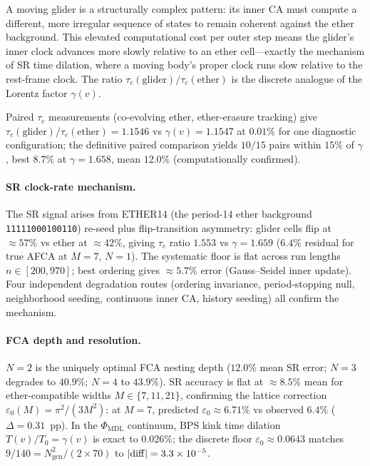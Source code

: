 \documentclass[11pt]{article}
\theoremstyle{remark}
\newcommand{\CatA}{computationally confirmed}
\begin{document}
A moving glider is a structurally complex pattern: its inner CA must compute
a different, more irregular sequence of states to remain coherent against
the ether background.
This elevated computational cost per outer step means the glider's inner
clock advances more slowly relative to an ether cell---exactly the mechanism
of SR time dilation, where a moving body's proper clock runs slow relative to
the rest-frame clock.
The ratio $\tau_c(\mathrm{glider})/\tau_c(\mathrm{ether})$ is the discrete
analogue of the Lorentz factor $\gamma(v)$.

Paired $\tau_c$ measurements (co-evolving ether, ether-erasure tracking)
give $\tau_c(\mathrm{glider})/\tau_c(\mathrm{ether}) = 1.1546$ vs
$\gamma(v) = 1.1547$ at $0.01\%$ for one diagnostic configuration; the
definitive paired comparison yields $10/15$ pairs within $15\%$ of $\gamma$,
best $8.7\%$ at $\gamma = 1.658$, mean $12.0\%$ (\CatA).

\paragraph{SR clock-rate mechanism.}
The SR signal arises from ETHER14 (the period-14 ether background \texttt{11111000100110}) re-seed plus flip-transition asymmetry:
glider cells flip at $\approx 57\%$ vs ether at $\approx 42\%$, giving
$\tau_c$ ratio $1.553$ vs $\gamma = 1.659$ ($6.4\%$ residual for true AFCA
at $M = 7$, $N = 1$).
The systematic floor is flat across run lengths $n \in [200, 970]$; best
ordering gives $\approx 5.7\%$ error (Gauss--Seidel inner update).
Four independent degradation routes (ordering invariance, period-stopping
null, neighborhood seeding, continuous inner CA, history seeding) all confirm
the mechanism.

\paragraph{FCA depth and resolution.}
$N = 2$ is the uniquely optimal FCA nesting depth ($12.0\%$ mean SR error;
$N = 3$ degrades to $40.9\%$; $N = 4$ to $43.9\%$).
SR accuracy is flat at $\approx 8.5\%$ mean for ether-compatible widths
$M \in \{7, 11, 21\}$, confirming the lattice correction
$\varepsilon_0(M) = \pi^2/(3M^2)$: at $M = 7$, predicted $\varepsilon_0
\approx 6.71\%$ vs observed $6.4\%$ ($\Delta = 0.31$~pp).
In the $\Phi_{\mathrm{MDL}}$ continuum, BPS kink time dilation
$T(v)/T_0 = \gamma(v)$ is exact to $0.026\%$; the discrete floor
$\varepsilon_0 \approx 0.0643$ matches $9/140 = N_{\mathrm{gen}}^2/(2 \times 70)$
to $|{\rm diff}| = 3.3 \times 10^{-5}$.
\end{document}
